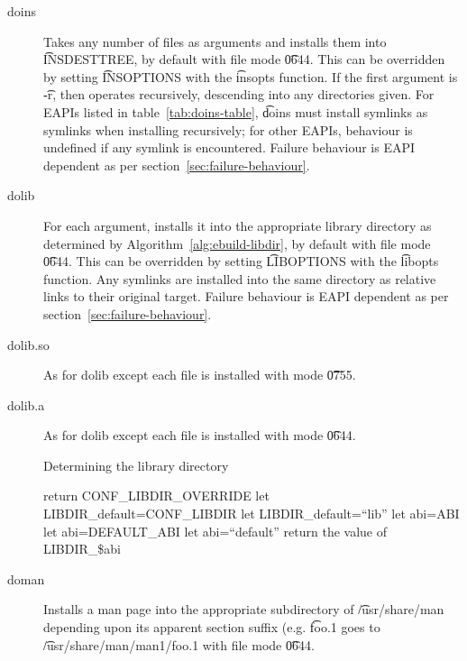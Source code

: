 \begin{description}
\item[doins]  Takes any number of files as arguments and installs them into
    \t{INSDESTTREE}, by default with file mode \t{0644}. This can be overridden by setting
    \t{INSOPTIONS} with the \t{insopts} function. If the first argument is \t{-r}, then operates
    recursively, descending into any directories given. For EAPIs listed in
    table~\ref{tab:doins-table}, \t{doins} must install symlinks as symlinks when installing
    recursively; for other EAPIs, behaviour is undefined if any symlink is encountered. Failure
    behaviour is EAPI dependent as per section~\ref{sec:failure-behaviour}.

\item[dolib] For each argument, installs it into the appropriate library directory as determined by
    Algorithm~\ref{alg:ebuild-libdir}, by default with file mode \t{0644}. This can be overridden by
    setting \t{LIBOPTIONS} with the \t{libopts} function. Any symlinks are installed into the same
    directory as relative links to their original target. Failure behaviour is EAPI dependent as per
    section~\ref{sec:failure-behaviour}.

\item[dolib.so] As for dolib except each file is installed with mode \t{0755}.

\item[dolib.a] As for dolib except each file is installed with mode \t{0644}.

\begin{algorithm}
\caption{Determining the library directory} \label{alg:ebuild-libdir}
\begin{algorithmic}[1]
    \STATE return CONF\_LIBDIR\_OVERRIDE
\ENDIF
{}
    \STATE let LIBDIR\_default=CONF\_LIBDIR
\ELSE
    \STATE let LIBDIR\_default=``lib''
\ENDIF
{}
    \STATE let abi=ABI
    \STATE let abi=DEFAULT\_ABI
\ELSE
    \STATE let abi=``default''
\ENDIF
\STATE return the value of LIBDIR\_\$abi
\end{algorithmic}
\end{algorithm}

\item[doman] Installs a man page into the appropriate subdirectory of \t{/usr/share/man} depending
    upon its apparent section suffix (e.g. \t{foo.1} goes to \t{/usr/share/man/man1/foo.1} with file
    mode \t{0644}.


\end{description}
